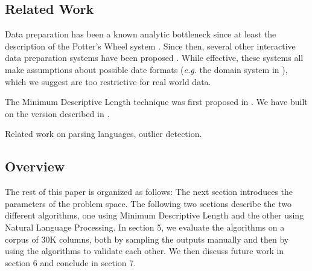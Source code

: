 
\subsection{Related Work}
Data preparation has been a known analytic bottleneck since at least the description of the Potter's Wheel system \cite{PottersWheel}. Since then, several other interactive data preparation systems have been proposed \cite{Wrangler,Refine}. While effective, these systems all make assumptions about possible date formats (\textit{e.g.} the domain system in \cite{PottersWheel}), which we suggest are too restrictive for real world data.

The Minimum Descriptive Length technique was first proposed in \cite{mdl}.  We have built on the version described in \cite{PottersWheel}.

Related work on parsing languages, outlier detection.

\subsection{Overview}
The rest of this paper is organized as follows: The next section introduces the parameters of the problem space. The following two sections describe the two different algorithms, one using Minimum Descriptive Length and the other using Natural Language Processing. In section 5, we evaluate the algorithms on a corpus of 30K columns, both by sampling the outputs manually and then by using the algorithms to validate each other. We then discuss future work in section 6 and conclude in section 7.
